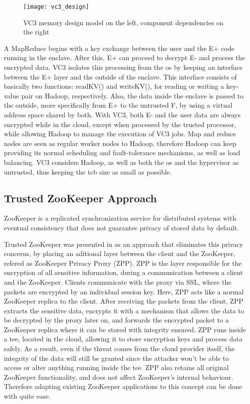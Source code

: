 \begin{figure}[htbp]
	\centering
	{\texttt{[image: vc3\_design]}}
	\caption{VC3 memory design model on the left, component dependencies on the right}
\end{figure}

A MapReduce begins with a key exchange between the user and the E+ code running in the enclave. After this, E+ can proceed to decrypt E- and process the encrypted data. VC3 isolates this processing from the \gls{os} by keeping an interface between the E+ layer and the outside of the enclave. This interface consists of basically two functions: readKV() and writeKV(), for reading or writing a key-value pair on Hadoop, respectively. Also, the data inside the enclave is passed to the outside, more specifically from E+ to the untrusted F, by using a virtual address space shared by both.
With VC3, both E- and the user data are always encrypted while in the cloud, except when processed by the trusted processor, while allowing Hadoop to manage the execution of VC3 jobs. Map and reduce nodes are seen as regular worker nodes to Hadoop, therefore Hadoop can keep providing its normal scheduling and fault-tolerance mechanisms, as well as load balancing. VC3 considers Hadoop, as well as both the \gls{os} and the hypervisor as untrusted, thus keeping the \gls{tcb} size as small as possible.

\subsection{Trusted ZooKeeper Approach}
\label{ssec:protected_zookeeper}

ZooKeeper \cite{zookeeper} is a replicated synchronization service for distributed systems with eventual consistency that does not guarantee privacy of stored data by default. 

Trusted ZooKeeper was presented in \cite{protectedZooKeeper} as an approach that eliminates this privacy concerns, by placing an aditional layer between the client and the ZooKeeper, refered as ZooKeeper Privacy Proxy (ZPP). ZPP is the layer responsible for the encryption of all sensitive information, during a communication between a client and the ZooKeeper. 
Clients communicate with the proxy via SSL, where the packets are encrypted by an individual session key. Here, ZPP acts like a normal ZooKeeper replica to the client. 
After receiving the packets from the client, ZPP extracts the sensitive data, encrypts it with a mechanism that allows the data to be decrypted by the proxy later on, and forwards the encrypted packet to a ZooKeeper replica where it can be stored with integrity ensured.
ZPP runs inside a \gls{tee}, located in the cloud, allowing it to store encryption keys and process data safely. As a result, even if the threat comes from the cloud provider itself, the integrity of the data will still be granted since the attacker won't be able to access or alter anything running inside the \gls{tee}.
ZPP also retains all original ZooKeeper functionality, and does not affect ZooKeeper's internal behaviour. Therefore adapting existing ZooKeeper applications to this concept can be done with quite ease.

